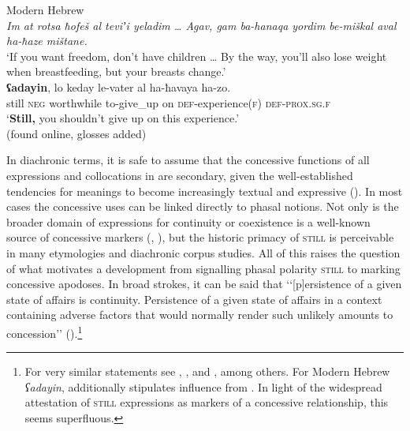 \begin{exe}
	\ex Modern Hebrew\label{exConcessiveConsequentHebrew}\\
	\textit{Im at rotsa ħofeš al teviʼi yeladim … Agav, gam ba-hanaqa yordim be-miškal aval ha-ħaze mištane.}\\
	\lq If you want freedom, don’t have children … By the way, you’ll also lose weight when breastfeeding, but your breasts change.\rq{}\\
	\gll \textbf{ʕadayin}, lo keday le-vater al ha-ħavaya ha-zo.\\
	still \textsc{neg} worthwhile to-give\_up on \textsc{def}-experience(\textsc{f}) \textsc{def}-\textsc{prox}.\textsc{sg}.\textsc{f}\\
	\glt \lq \textbf{Still,} you shouldn’t give up on this experience.\rq{}
	\\(found online, glosses added)%
\end{exe}

\begin{sloppypar}
In diachronic terms, it is safe to assume that the concessive functions of all expressions and collocations in  are secondary, given the well-established tendencies for meanings to become increasingly textual and expressive (). In most cases the concessive uses can be linked directly to phasal notions. Not only is the broader domain of expressions for continuity or coexistence is a well-known source of concessive markers (\cite{Koenig1985}, \citeyear{KoenigConcessives}), but the historic primacy of \textsc{still} is perceivable in many etymologies and diachronic corpus studies. All of this raises the question of what motivates a development from signalling phasal polarity \textsc{still} to marking concessive apodoses. In broad strokes, it can be said that \lq\lq [p]ersistence of a given state of affairs is continuity. Persistence of a given state of affairs in a context containing adverse factors that would normally render such  unlikely amounts to concession\rq\rq{ }(\cite[13]{EderlyCurco2016}).\footnote{For very similar statements see \textcite{JingSchmidtGries2009}, \textcite{Michaelis1993}, \textcite{Kockelman2020} and \textcite{Yeh1998}, among others. For Modern Hebrew \textit{ʕadayin}, \textcite{TsirkinSadan2019} additionally stipulates influence from . In light of the widespread attestation of \textsc{still} expressions as markers of a concessive relationship, this seems superfluous.}
\end{sloppypar}

